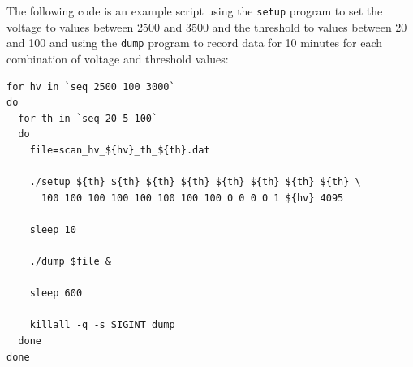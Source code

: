 \documentclass[12pt, a4paper]{article}
\begin{document}
The following code is an example script using the \texttt{setup} program to set the voltage to values between 2500 and 3500 and the threshold to values between 20 and 100 and using the \texttt{dump} program to record data for 10 minutes for each combination of voltage and threshold values:
\vspace{-1ex}
\begin{verbatim}
for hv in `seq 2500 100 3000`
do
  for th in `seq 20 5 100`
  do
    file=scan_hv_${hv}_th_${th}.dat

    ./setup ${th} ${th} ${th} ${th} ${th} ${th} ${th} ${th} \
      100 100 100 100 100 100 100 100 0 0 0 0 1 ${hv} 4095

    sleep 10

    ./dump $file &

    sleep 600

    killall -q -s SIGINT dump
  done
done
\end{verbatim}

\newpage

\printbibliography
\end{document}
